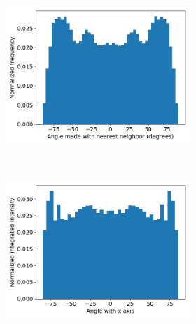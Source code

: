 \documentclass{article}
\begin{document}
  \begin{figure}[ht]
  \centering
  	\begin{subfigure}{\linewidth}
	\centering
		\begin{subfigure}{0.45\textwidth}
        		\centering
        		\includegraphics[width=\linewidth]{offset_tail_packing.png}
        		\caption{}~\label{fig:offset_tails}
		\end{subfigure}
		\begin{subfigure}{0.45\textwidth}
		\centering
	        	\includegraphics[width=\linewidth]{offset_angle_v_I.png}
		        \caption{}~\label{fig:layered_tails}
		\end{subfigure}
	\end{subfigure}

\end{figure}
\end{document}
